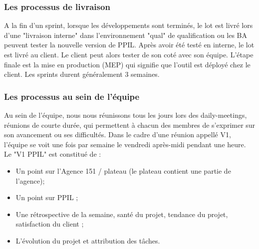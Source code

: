 \subsubsection{Les processus de livraison}
A la fin d'un sprint, lorsque les développements sont terminés, le lot est livré lors d'une "livraison interne" dans l'environnement "qual" de qualification ou les BA peuvent tester la nouvelle version de PPIL. Après avoir été testé en interne, le lot est livré au client. Le client peut alors tester de son coté avec son équipe. L'étape finale est la mise en production (MEP) qui signifie que l'outil est  déployé chez le client. Les sprints durent généralement 3 semaines.
\subsubsection{Les processus au sein de l'équipe}
Au sein de l'équipe, nous nous réunissons tous les jours lors des daily-meetings, réunions de courte durée, qui permettent à chacun des membres de s'exprimer sur son avancement ou ses difficultés. Dans le cadre d'une réunion appellé V1, l'équipe se voit une fois par semaine le vendredi après-midi pendant une heure. 
Le "V1 PPIL" est constitué de :
\begin{itemize}
    \item Un point sur l'Agence 151 / plateau (le plateau contient une partie de l'agence);
    \item Un point sur PPIL ; 
    \item Une rétrospective de la semaine, santé du projet, tendance du projet, satisfaction du client ;
    \item L'évolution du projet et attribution des tâches.
\end{itemize}
